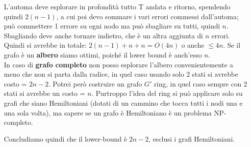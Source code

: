 L'automa deve esplorare in profondità tutto T andata e ritorno, spendendo quindi
$2(n-1)$, a cui poi devo sommare i vari errori commessi dall'automa; può
commettere 1 errore su ogni nodo ma può sbagliare su tutti, quindi $n$.
Sbagliando deve anche tornare indietro, che è un altra aggiunta di $n$ errori.
Quindi si avrebbe in totale: $2(n-1)+n+n = O(4n) $ o anche $\leq 4n$. Se il
grafo è un \textbf{albero} siamo ottimi, poiché il lower bound è anch'esso
$n$.\\
In caso di \textbf{grafo completo} non posso esplorare l'albero convenientemente
a meno che non si parta dalla radice, in quel caso usando solo 2 stati si
avrebbe costo = $2n-2$. Potrei però costruire un grafo $G'$ ring, in quel caso
sempre con 2 stati si avrebbe un costo = $n$. Purtroppo l'idea del ring si può
applicare solo su grafi che siano Hemiltoniani (dotati di un cammino che tocca
tutti i nodi una e una sola volta), ma sapere se un grafo è Hemiltoniano è un
problema NP-completo.

Concludiamo quindi che il lower-bound è $2n-2$, esclusi i grafi Hemiltoniani.

